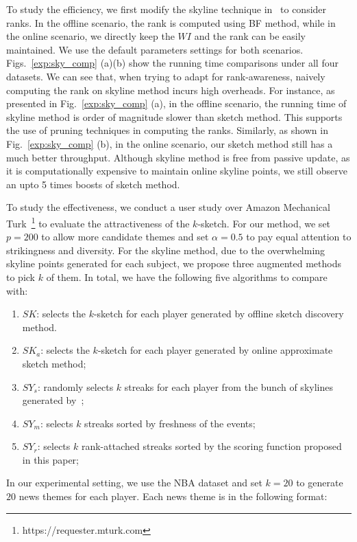 To study the efficiency, we first modify the skyline technique in~\cite{zhang2014discovering} to consider ranks. In the offline scenario, the rank is computed using BF method, while in the online scenario, we directly keep the $WI$ and the rank can be easily maintained. We use the default parameters settings for both scenarios. Figs.~\ref{exp:sky_comp} (a)(b) show the running time comparisons under all four datasets. We can see that, when trying to adapt for rank-awareness, naively computing the rank on skyline method incurs high overheads. For instance, as presented in Fig.~\ref{exp:sky_comp} (a), in the offline scenario, the running time of skyline method is order of magnitude slower than sketch method. This supports the use of pruning techniques in computing the ranks. Similarly, as shown in Fig.~\ref{exp:sky_comp} (b), in the online scenario, our sketch method still has a much better throughput. Although skyline method is free from passive update, as it is computationally expensive to maintain online skyline points, we still observe an upto 5 times boosts of sketch method.


To study the effectiveness, we conduct a user study over Amazon Mechanical Turk~\footnote{https://requester.mturk.com} to evaluate the attractiveness of the $k$-sketch. For our method, we set $p=200$ to allow more candidate themes and set $\alpha=0.5$ to pay equal attention to strikingness and diversity. For the skyline method, due to the overwhelming skyline points generated for each subject, we propose three augmented methods to pick $k$ of them. In total, we have the following five algorithms to compare with:
\begin{enumerate}
\setlength\itemsep{-0.1cm}
\item{$SK$: selects the $k$-sketch for each player generated by offline sketch discovery method.}
\item{$SK_a$: selects the $k$-sketch for each player generated by online approximate sketch method;}
\item{$SY_s$: randomly selects $k$ streaks for each player from the bunch of skylines generated by~\cite{zhang2014discovering};}
\item{$SY_m$: selects $k$ streaks sorted by freshness of the events;}
\item{$SY_r$: selects $k$ rank-attached streaks sorted by
the scoring function proposed in this paper;}
\end{enumerate}

In our experimental setting, we use the NBA dataset and set $k=20$ to generate $20$ news themes for each player. Each news theme is in the following format:

